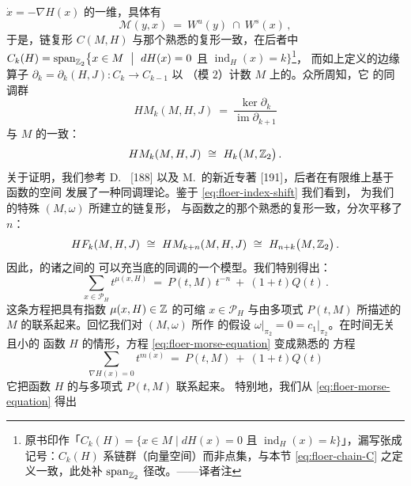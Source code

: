 $\dot{x}=-\nabla H(x)$ 的一维\trConnectingOrbit，具体有
\begin{equation}\label{eq:floer-myx-ws}
\mathcal{M}(y,x)\ =\ W^{u}(y)\ \cap\ W^{s}(x)\,,
\end{equation}
于是，链复形 $C(M,H)$ 与那个熟悉的\trMorse{}复形一致，在后者中%
$C_{k}(H)=\operatorname{span}_{\Z_{2}}\bigl\{x\in M\ \bigm|\ dH(x)=0$ 且 $\operatorname{ind}_{H}(x)=k\bigr\}$\footnote{原书印作「$C_{k}(H)=\{x\in M\mid dH(x)=0$ 且 $\operatorname{ind}_{H}(x)=k\}$」，漏写张成记号：$C_{k}(H)$ 系链群（向量空间）而非点集，与本节 \eqref{eq:floer-chain-C} 之定义一致，此处补 $\operatorname{span}_{\mathbb{Z}_{2}}$ 径改。——译者注}，%
而如上定义的边缘算子 $\partial_{k}=\partial_{k}(H,J):C_{k}\to C_{k-1}$ 以%
（模 $2$）计数 $M$ 上\trGradient\trFlow{}的\trConnectingOrbit。众所周知，它%
的同调群
\begin{equation}\label{eq:floer-morse-homology}
HM_{k}(M,H,J)\ =\ \frac{\ker\partial_{k}}{\operatorname{im}\partial_{k+1}}
\end{equation}
与 $M$ 的\trSingularHomology{}一致：
\begin{equation}\label{eq:floer-morse-singular}
HM_{k}(M,H,J)\ \cong\ H_{k}\bigl(M,\mathbb{Z}_{2}\bigr)\,.
\end{equation}
关于证明，我们参考 D.~\trSalamon{} [188] 以及 M.~\trSchwarz{}的新近专著%
[191]，后者在有限维\trManifold{}上基于\trMorse{}函数的\trTrajectory{}空间%
发展了一种\trMorse{}同调理论。鉴于 \eqref{eq:floer-index-shift} 我们看到，%
\trFloer{}为我们的特殊\trSymplecticManifold{} $(M,\omega)$ 所建立的链复形，%
与函数之\trGradient\trFlow{}的那个熟悉的\trMorse{}复形一致，分次平移了 $n$：
\begin{equation}\label{eq:floer-grading-shift}
HF_{k}(M,H,J)\ \cong\ HM_{k+n}(M,H,J)\ \cong\ H_{n+k}\bigl(M,\Z_{2}\bigr)\,.
\end{equation}
因此，\trFloer{}的诸\trNondegenerate\trPeriodicSolution{}之间的%
\trConnectingOrbit{}可以充当底\trManifold{}的同调的一个模型。我们特别得出：
\begin{equation}\label{eq:floer-morse-equation}
\sum_{x\in\mathcal{P}_{H}}t^{\mu(x,H)}\ =\ P(t,M)\,t^{-n}\ +\ (1+t)Q(t)\,.
\end{equation}
这条\trMorse{}方程把具有指数 $\mu(x,H)\in\mathbb{Z}$ 的\trNondegenerate{}可缩%
\trPeriodicSolution{} $x\in\mathcal{P}_{H}$ 与由\trPoincare{}多项式%
$P(t,M)$ 所描述的 $M$ 的\trTopology{}联系起来。回忆我们对 $(M,\omega)$ 所作%
的假设 $\omega\big|_{\pi_{2}}=0=c_{1}\big|_{\pi_{2}}$。在时间无关且小的%
\trMorse{}函数 $H$ 的情形，方程 \eqref{eq:floer-morse-equation} 变成熟悉的%
\trMorse{}方程
\begin{equation}\label{eq:floer-morse-equation-classical}
\sum_{\nabla H(x)=0}t^{m(x)}\ =\ P(t,M)\ +\ (1+t)Q(t)
\end{equation}
它把函数 $H$ 的\trCriticalPoint{}与\trPoincare{}多项式 $P(t,M)$ 联系起来。%
特别地，我们从 \eqref{eq:floer-morse-equation} 得出


